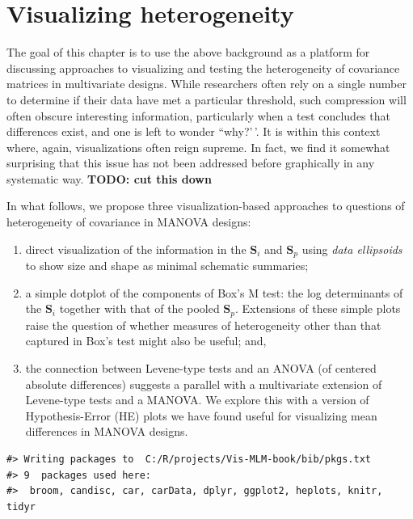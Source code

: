 \documentclass[
  letterpaper,
  10pt,
  krantz2]{krantz}
\begin{document}
\section{Visualizing heterogeneity}\label{visualizing-heterogeneity}

The goal of this chapter is to use the above background as a platform
for discussing approaches to visualizing and testing the heterogeneity
of covariance matrices in multivariate designs. While researchers often
rely on a single number to determine if their data have met a particular
threshold, such compression will often obscure interesting information,
particularly when a test concludes that differences exist, and one is
left to wonder ``why?'\,'. It is within this context where, again,
visualizations often reign supreme. In fact, we find it somewhat
surprising that this issue has not been addressed before graphically in
any systematic way. \textbf{TODO: cut this down}

In what follows, we propose three visualization-based approaches to
questions of heterogeneity of covariance in MANOVA designs:

\begin{enumerate}
\def\labelenumi{(\alph{enumi})}
\item
  direct visualization of the information in the \(\mathbf{S}_i\) and
  \(\mathbf{S}_p\) using \emph{data ellipsoids} to show size and shape
  as minimal schematic summaries;
\item
  a simple dotplot of the components of Box's M test: the log
  determinants of the \(\mathbf{S}_i\) together with that of the pooled
  \(\mathbf{S}_p\). Extensions of these simple plots raise the question
  of whether measures of heterogeneity other than that captured in Box's
  test might also be useful; and,
\item
  the connection between Levene-type tests and an ANOVA (of centered
  absolute differences) suggests a parallel with a multivariate
  extension of Levene-type tests and a MANOVA. We explore this with a
  version of Hypothesis-Error (HE) plots we have found useful for
  visualizing mean differences in MANOVA designs.
\end{enumerate}

\begin{verbatim}
#> Writing packages to  C:/R/projects/Vis-MLM-book/bib/pkgs.txt
#> 9  packages used here:
#>  broom, candisc, car, carData, dplyr, ggplot2, heplots, knitr, tidyr
\end{verbatim}
\end{document}
